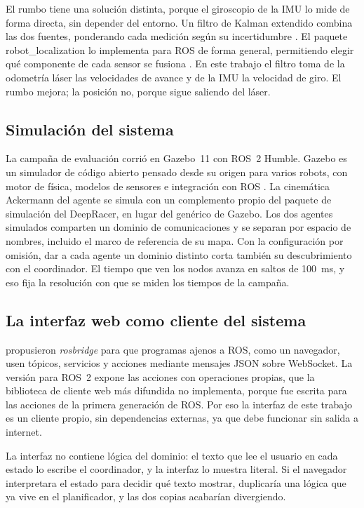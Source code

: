 El rumbo tiene una solución distinta, porque el giroscopio de la IMU lo mide de
forma directa, sin depender del entorno. Un filtro de Kalman extendido combina
las dos fuentes, ponderando cada medición según su incertidumbre
\autocite{thrun2005probabilistic}. El paquete robot\_localization lo implementa
para ROS de forma general, permitiendo elegir qué componente de cada sensor se
fusiona \autocite{moore2014generalized}. En este trabajo el filtro toma de la
odometría láser las velocidades de avance y de la IMU la velocidad de giro. El
rumbo mejora; la posición no, porque sigue saliendo del láser.

\subsection{Simulación del sistema}
\label{sec:teo-simulacion}

La campaña de evaluación corrió en Gazebo~11 con ROS~2 Humble. Gazebo es un
simulador de código abierto pensado desde su origen para varios robots, con motor
de física, modelos de sensores e integración con ROS \autocite{koenig2004gazebo}.
La cinemática Ackermann del agente se simula con un complemento propio del
paquete de simulación del DeepRacer, en lugar del genérico de Gazebo. Los dos agentes simulados comparten un dominio de comunicaciones y se separan por espacio de
nombres, incluido el marco de referencia de su mapa. Con la configuración por
omisión, dar a cada agente un dominio distinto corta también su descubrimiento con el coordinador. El tiempo que ven los nodos avanza en saltos
de 100~ms, y eso fija la resolución con que se miden los tiempos de la campaña.

\subsection{La interfaz web como cliente del sistema}
\label{sec:teo-interfaz}

\textcite{crick2017rosbridge} propusieron \textit{rosbridge} para que programas
ajenos a ROS, como un navegador, usen tópicos, servicios y acciones mediante
mensajes JSON sobre WebSocket. La versión para ROS~2 expone las acciones con
operaciones propias, que la biblioteca de cliente web más difundida no
implementa, porque fue escrita para las acciones de la primera generación de ROS.
Por eso la interfaz de este trabajo es un cliente propio, sin dependencias
externas, ya que debe funcionar sin salida a internet.

La interfaz no contiene lógica del dominio: el texto que lee el usuario en cada
estado lo escribe el coordinador, y la interfaz lo muestra literal. Si el
navegador interpretara el estado para decidir qué texto mostrar, duplicaría una
lógica que ya vive en el planificador, y las dos copias acabarían divergiendo.

